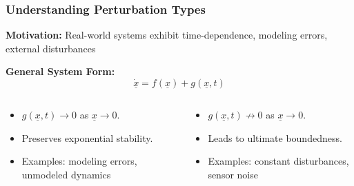 \documentclass[student, noshadow, lsr, english, aspectratio=169, t]{ITR_LSR_slides}
\begin{document}
\begin{frame}
    \frametitle{Understanding Perturbation Types}

    \textbf{Motivation:} Real-world systems exhibit time-dependence, modeling errors, external disturbances

    \vspace{0.5cm}
    \textbf{General System Form:}
    \[\dot{\underline{x}} = f(\underline{x}) + g(\underline{x}, t)\]

	\vspace{-0.5em}
    \begin{columns}[t,totalwidth=\textwidth]
		\begin{tcolorbox}[title=Vanishing Perturbation:]
			\begin{itemize}
				\item $g(\underline{x}, t) \to 0$ as $\underline{x} \to 0$.
				\item Preserves exponential stability.
				\item Examples: modeling errors, unmodeled dynamics
			\end{itemize}
		\end{tcolorbox}

        \begin{tcolorbox}[title=Non-Vanishing Perturbation:]
			\begin{itemize}
				\item $g(\underline{x}, t) \not\to 0$ as $\underline{x} \to 0$.
				\item Leads to ultimate boundedness.
				\item Examples: constant disturbances, sensor noise
			\end{itemize}
		\end{tcolorbox}
    \end{columns}
\end{frame}

\end{document}
